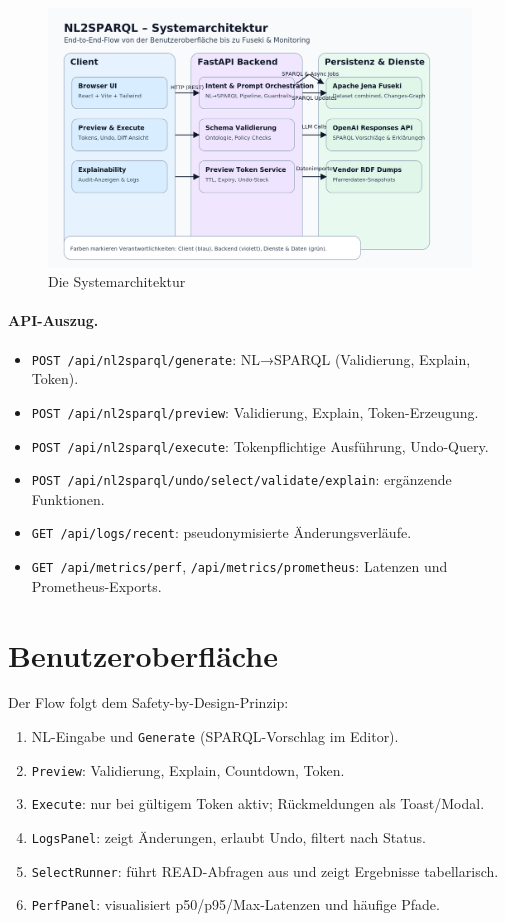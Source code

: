 \begin{figure}[h]
\centering
\includegraphics[width=\linewidth]{Abbildungen/NL2SPARQL_Systemarchitektur_clean_v3.png}
\caption{Die Systemarchitektur}
\label{fig:Systemarchitektur}
\end{figure}

\paragraph{API-Auszug.}
\begin{itemize}
  \item \texttt{POST /api/nl2sparql/generate}: NL→SPARQL (Validierung, Explain, Token).
  \item \texttt{POST /api/nl2sparql/preview}: Validierung, Explain, Token-Erzeugung.
  \item \texttt{POST /api/nl2sparql/execute}: Tokenpflichtige Ausführung, Undo-Query.
  \item \texttt{POST /api/nl2sparql/undo/select/validate/explain}: ergänzende Funktionen.
  \item \texttt{GET /api/logs/recent}: pseudonymisierte Änderungsverläufe.
  \item \texttt{GET /api/metrics/perf}, \texttt{/api/metrics/prometheus}: Latenzen und Prometheus-Exports.
\end{itemize}

\section{Benutzeroberfläche}
Der Flow folgt dem Safety-by-Design-Prinzip:
\begin{enumerate}
  \item NL-Eingabe und \texttt{Generate} (SPARQL-Vorschlag im Editor).
  \item \texttt{Preview}: Validierung, Explain, Countdown, Token.
  \item \texttt{Execute}: nur bei gültigem Token aktiv; Rückmeldungen als Toast/Modal.
  \item \texttt{LogsPanel}: zeigt Änderungen, erlaubt Undo, filtert nach Status.
  \item \texttt{SelectRunner}: führt READ-Abfragen aus und zeigt Ergebnisse tabellarisch.
  \item \texttt{PerfPanel}: visualisiert p50/p95/Max-Latenzen und häufige Pfade.
\end{enumerate}


